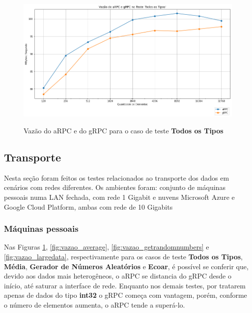 \begin{figure}[!ht]
    \centering
    \caption{Vazão do aRPC e do gRPC para o caso de teste \textbf{Todos os Tipos}}
    \includegraphics[width=\textwidth]{figuras/transporte/vazao_alltypes.png} 
    \label{fig:vazao_alltypes}
\end{figure}

\subsection{Transporte}

Nesta seção foram feitos os testes relacionados ao transporte dos dados em cenários com redes diferentes. Os ambientes foram: conjunto de máquinas pessoais numa LAN fechada, com rede 1 Gigabit e nuvens Microsoft Azure e Google Cloud Platform, ambas com rede de 10 Gigabits

\subsubsection{Máquinas pessoais}
\label{subsubsection:maquinas_pessoais}

Nas Figuras \ref{fig:vazao_alltypes}, \ref{fig:vazao_average}, \ref{fig:vazao_getrandomnumbers} e \ref{fig:vazao_largedata}, respectivamente para os casos de teste \textbf{Todos os Tipos}, \textbf{Média}, \textbf{Gerador de Números Aleatórios} e \textbf{Ecoar}, é possível se conferir que, devido aos dados mais heterogêneos, o aRPC se distancia do gRPC desde o início, até saturar a interface de rede. Enquanto nos demais testes, por tratarem apenas de dados do tipo \textbf{int32} o gRPC começa com vantagem, porém, conforme o número de elementos aumenta, o aRPC tende a superá-lo.

